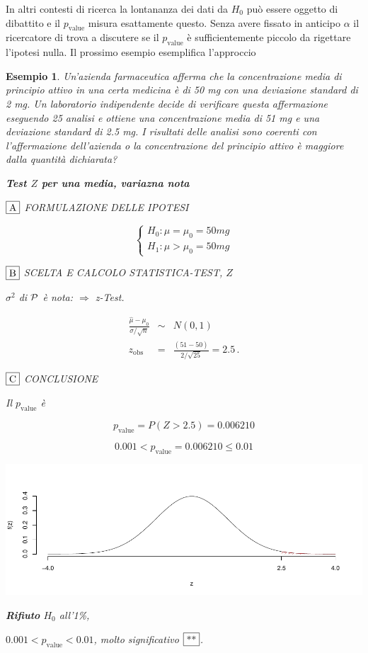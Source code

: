 \documentclass[
  11pt,
]{book}
\theoremstyle{mytheoremstyle}
\theoremstyle{mydefstyle}
\newtheorem{example}{{Esempio}}[section]
\begin{document}
In altri contesti di ricerca la lontananza dei dati da \(H_0\) può essere oggetto
di dibattito e il \(p_\text{value}\) misura esattamente questo. Senza avere fissato
in anticipo \(\alpha\) il ricercatore di trova a discutere se il \(p_\text{value}\)
è sufficientemente piccolo da rigettare l'ipotesi nulla.
Il prossimo esempio esemplifica l'approccio

\begin{example}
Un'azienda farmaceutica afferma che la concentrazione media di principio attivo
in una certa medicina è di 50 mg con una deviazione standard di 2 mg. Un
laboratorio indipendente decide di verificare questa affermazione eseguendo
25 analisi e ottiene una concentrazione media di 51 mg e una deviazione standard
di 2.5 mg. I risultati delle analisi sono coerenti con l'affermazione
dell'azienda o la concentrazione del principio attivo è maggiore dalla quantità
dichiarata?

\textbf{Test \(Z\) per una media, variazna nota}

\(\fbox{A}\) FORMULAZIONE DELLE IPOTESI

\[\begin{cases}
   H_0: \mu = \mu_0=50mg \\
   H_1: \mu > \mu_0=50mg 
   \end{cases}\]

\(\fbox{B}\) SCELTA E CALCOLO STATISTICA-TEST, \(Z\)

\(\sigma^{2}\) di \(\cal{P}\) è nota: \(\Rightarrow\) z-Test.

\begin{eqnarray*}
   \frac{\hat\mu - \mu_{0}} {\sigma/\sqrt{n}}&\sim&N(0,1)\\
   z_{\text{obs}}
   &=& \frac{ ( 51 -  50 )} { 2 /\sqrt{ 25 }}
   =   2.5 \, .
   \end{eqnarray*}

\(\fbox{C}\) CONCLUSIONE

Il \(p_{\text{value}}\) è

\[ p_{\text{value}} = P(Z>2.5)=0.006210 \]

\[
 0.001 < p_\text{value}= 0.006210 \leq 0.01 
\]

\begin{center}\includegraphics{Appunti_di_Statistica_2025_files/figure-latex/15-test-mu-pi-21-1} \end{center}

\textbf{Rifiuto} \(H_0\) all'1\%,

\(0.001<p_\text{value}<0.01\), \emph{molto significativo} \(\fbox{**}\).
\end{example}
\end{document}
